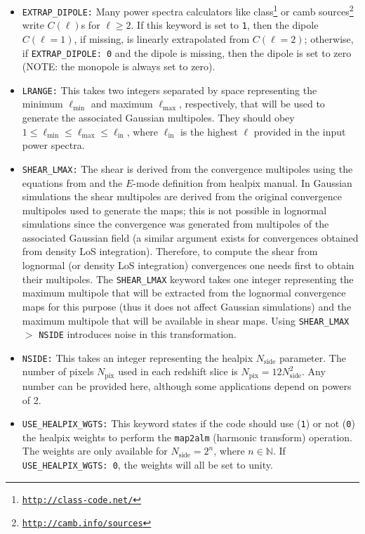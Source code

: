 \documentclass[12pt]{book} %
\newcommand{\nv}[1]{\mathrm{#1}}                 %
\begin{document}
\begin{itemize}
\item {\tt EXTRAP\_DIPOLE:} Many power spectra calculators like 
  {\sc class}\footnote{\tt{\href{http://class-code.net/}{http://class-code.net/}}} or 
  {\sc camb sources}\footnote{\tt{\href{http://camb.info/sources}{http://camb.info/sources}}} 
  write $C(\ell)$s for $\ell\geq 2$. If this keyword is set to {\tt 1}, then the dipole $C(\ell=1)$, 
  if missing, is linearly extrapolated from $C(\ell=2)$; otherwise, if {\tt EXTRAP\_DIPOLE: 0} and the 
  dipole is missing, then the dipole is set to zero (NOTE: the monopole is always set to zero).

\item {\tt LRANGE:} This takes two integers separated by space representing the minimum 
  $\ell_{\nv{min}}$ and maximum $\ell_{\nv{max}}$, respectively, that will be used to generate the 
  associated Gaussian multipoles. They should obey $1 \leq \ell_{\nv{min}} \leq \ell_{\nv{max}} \leq \ell_{\nv{in}}$, 
  where $\ell_{\nv{in}}$ is the highest $\ell$ provided in the input power spectra.

\item {\tt SHEAR\_LMAX:} The shear is derived from the convergence multipoles using the equations 
  from \citet{Hu00x} and the $E$-mode definition from {\sc healpix} manual. In Gaussian simulations 
  the shear multipoles are derived from the original convergence multipoles used to generate the maps; 
  this is not possible in lognormal simulations since the convergence was generated from multipoles of the 
  associated Gaussian field (a similar argument exists for convergences obtained from density LoS integration). 
  Therefore, to compute the shear from lognormal (or density LoS integration) convergences one needs first to 
  obtain their multipoles. The {\tt SHEAR\_LMAX} keyword takes one integer representing 
  the maximum multipole that will be extracted from the lognormal convergence maps for this purpose (thus it 
  does not affect Gaussian simulations) and the maximum multipole that will be available in shear maps. 
  Using {\tt SHEAR\_LMAX} $>$ {\tt NSIDE} introduces noise in this transformation.
  
\item {\tt NSIDE:} This takes an integer representing the {\sc healpix} $N_{\nv{side}}$ parameter. 
  The number of pixels $N_{\nv{pix}}$ used in each redshift slice is $N_{\nv{pix}}=12N_{\nv{side}}^2$. 
  Any number can be provided here, although some applications depend on powers of 2.

\item {\tt USE\_HEALPIX\_WGTS:} This keyword states if the code should use ({\tt 1}) or not ({\tt 0}) 
  the {\sc healpix} weights to perform the {\tt map2alm} (harmonic transform) operation. The 
  weights are only available for $N_{\nv{side}}=2^n$, where $n\in \mathbb{N}$. If 
  {\tt USE\_HEALPIX\_WGTS: 0}, the weights will all be set to unity.


\end{itemize}
\end{document}
